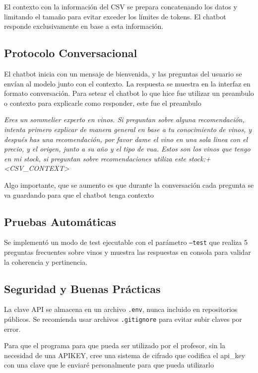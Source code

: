 \documentclass[conference]{IEEEtran}
\begin{document}
El contexto con la información del CSV se prepara concatenando los datos y
limitando el tamaño para evitar exceder los límites de tokens. El chatbot
responde exclusivamente en base a esta información.


\subsection{Protocolo Conversacional}

El chatbot inicia con un mensaje de bienvenida, y las preguntas del usuario se
envían al modelo junto con el contexto. La respuesta se muestra en la interfaz
en formato conversación. Para setear el chatbot lo que hice fue utilizar
un preambulo o contexto para explicarle como responder, este fue el preambulo

\textit{
Eres un sommelier experto en vinos. Si preguntan sobre alguna recomendación,
intenta primero explicar de manera general en base a tu conocimiento de vinos,
y después has una recomendación, por favor dame el vino en una sola linea con
el precio, y el origen, junto a su año y el tipo de vua. Estos son los vinos
que tengo en mi stock, si preguntan sobre recomendaciones utiliza este
stock:+ <CSV\_CONTEXT>}

Algo importante, que se aumento es que durante la conversación cada
pregunta se va guardando para que el chatbot tenga contexto

\subsection{Pruebas Automáticas}

Se implementó un modo de test ejecutable con el parámetro \texttt{--test} que
realiza 5 preguntas frecuentes sobre vinos y muestra las respuestas en consola
para validar la coherencia y pertinencia.

\subsection{Seguridad y Buenas Prácticas}

La clave API se almacena en un archivo \texttt{.env}, nunca incluido en
repositorios públicos. Se recomienda usar archivos \texttt{.gitignore} para
evitar subir claves por error.

Para que el programa para que pueda ser utilizado por el profesor, sin la necesidad
de una APIKEY,
cree una sistema de cifrado que codifica el api\_key con una clave que le enviaré personalmente
para que pueda utilizarlo
\end{document}
